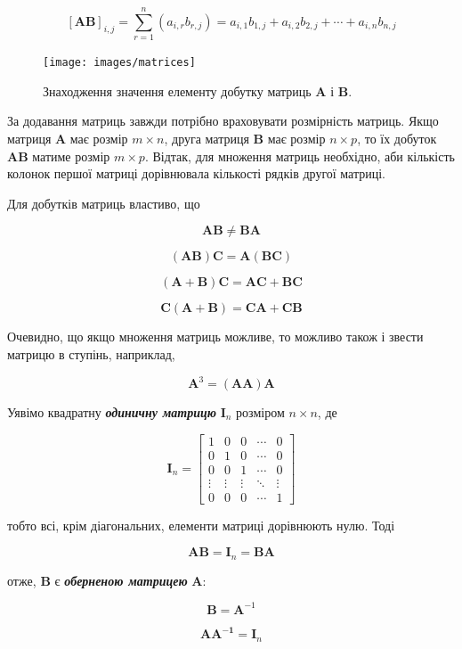 \documentclass[
  11pt,
]{book}
\begin{document}
\[[\mathbf{AB}]_{i, j} = \sum \limits_{r=1}^n (a_{i,r} b_{r, j}) = a_{i,1} b_{1, j} + a_{i, 2}b_{2, j} + \cdots + a_{i, n}b_{n, j}\]

\begin{figure}
\texttt{[image: images/matrices]} \caption{Знаходження значення елементу добутку матриць $\mathbf{A}$ і $\mathbf{B}$.}\label{fig:fig-3-7}
\end{figure}

За додавання матриць завжди потрібно враховувати розмірність матриць. Якщо матриця \(\mathbf{A}\) має розмір \(m \times n\), друга матриця \(\mathbf{B}\) має розмір \(n \times p\), то їх добуток \(\mathbf{AB}\) матиме розмір \(m \times p\). Відтак, для множення матриць необхідно, аби кількість колонок першої матриці дорівнювала кількості рядків другої матриці.

Для добутків матриць властиво, що

\[\mathbf{AB} \neq \mathbf{BA}\]

\[(\mathbf{AB})\mathbf{C} = \mathbf{A}(\mathbf{BC})\]

\[(\mathbf{A+B})\mathbf{C} = \mathbf{AC} + \mathbf{BC}\]

\[\mathbf{C}(\mathbf{A+B}) = \mathbf{CA} + \mathbf{CB}\]

Очевидно, що якщо множення матриць можливе, то можливо також і звести матрицю в ступінь, наприклад,

\[\mathbf{A}^3 = (\mathbf{AA})\mathbf{A}\]

Уявімо квадратну \textbf{\emph{одиничну матрицю}} \(\mathbf{I}_n\) розміром \(n \times n\), де

\[\mathbf{I}_n = \begin{bmatrix}
1 & 0 & 0 & \cdots & 0\\
0 & 1 & 0 & \cdots & 0\\
0 & 0 & 1 & \cdots & 0\\
\vdots & \vdots & \vdots & \ddots  &\vdots \\
0 & 0 & 0 & \cdots & 1
\end{bmatrix}\]

тобто всі, крім діагональних, елементи матриці дорівнюють нулю. Тоді

\[\mathbf{AB} = \mathbf{I}_n = \mathbf{BA}\]

отже, \(\mathbf{B}\) є \textbf{\emph{оберненою матрицею}} \(\mathbf{A}\):

\[\mathbf{B} = \mathbf{A}^{-1}\]

\[\mathbf{AA^{-1}} = \mathbf{I}_n\]
\end{document}
